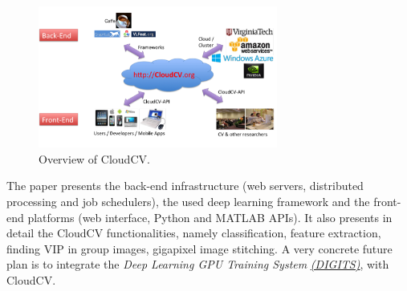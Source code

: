 \begin{figure}[H]
\begin{center}
\includegraphics[width=0.7\textwidth]{fig/CloudCV}
\end{center}
\caption{Overview of CloudCV.}
\label{fig:cloudcv}
\end{figure}

The paper presents the back-end infrastructure (web servers, distributed processing and job schedulers), the used deep learning framework and the front-end platforms (web interface, Python and MATLAB APIs). It also presents in detail the CloudCV functionalities, namely classification, feature extraction, finding VIP in group images, gigapixel image stitching. A very concrete future plan is to integrate the {\em Deep Learning GPU Training System} \href{https://developer.nvidia.com/digits}{\underline{\em (DIGITS)}}, \cite{digits_soft} with CloudCV. 